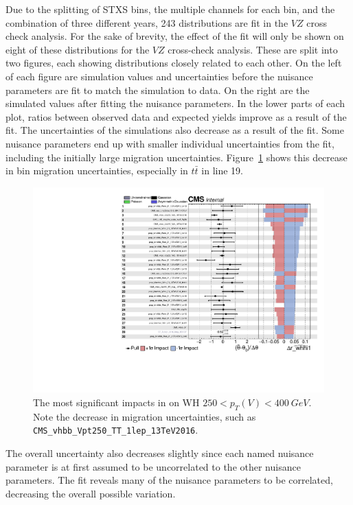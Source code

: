 Due to the splitting of STXS bins, the multiple channels for each bin, and the combination of three different years,
243 distributions are fit in the $V\!Z$ cross check analysis.
For the sake of brevity, the effect of the fit will only be shown on eight of these distributions for the $V\!Z$
cross-check analysis.
These are split into two figures, each showing distributions closely related to each other.
On the left of each figure are simulation values and uncertainties
before the nuisance parameters are fit to match the simulation to data.
On the right are the simulated values after fitting the nuisance parameters.
In the lower parts of each plot, ratios between observed data and expected yields improve as a result of the fit.
The uncertainties of the simulations also decrease as a result of the fit.
Some nuisance parameters end up with smaller individual uncertainties from the fit,
including the initially large migration uncertainties.
Figure~\ref{fig:impact-ex} shows this decrease in bin migration uncertainties,
especially in $t\bar{t}$ in line 19.
%
\begin{figure}
  \centering
  \includegraphics[width=0.8\linewidth,page=1]{figures/impacts/impacts_r_whhi1.pdf}
  \caption[Example impacts for WH $250 < p_T(V) < \SI{400}{GeV}$]{
    The most significant impacts in on WH $250 < p_T(V) < \SI{400}{GeV}$.
    Note the decrease in migration uncertainties, such as \texttt{CMS\_vhbb\_Vpt250\_TT\_1lep\_13TeV2016}.
  }
  \label{fig:impact-ex}
\end{figure}
%
The overall uncertainty also decreases slightly since each named nuisance parameter is at first
assumed to be uncorrelated to the other nuisance parameters.
The fit reveals many of the nuisance parameters to be correlated, decreasing the overall possible variation.

